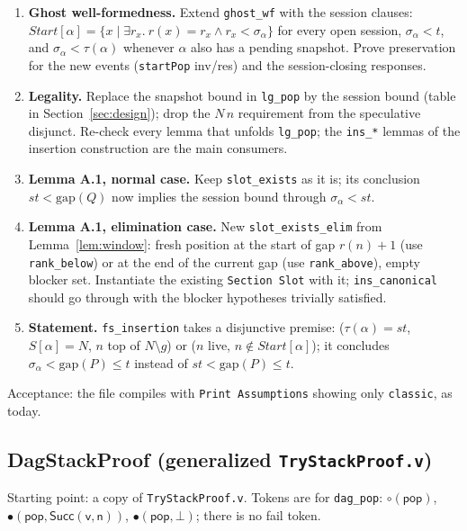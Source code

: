 \documentclass[11pt]{article}
\theoremstyle{definition}
\theoremstyle{remark}
\newcommand{\code}[1]{\texttt{#1}}
\newcommand{\file}[1]{\texttt{#1}}
\newcommand{\Start}{\mathit{Start}}
\newcommand{\sess}{\sigma}
\newcommand{\sol}[1]{\textbf{#1}}
\newcommand{\tok}[1]{\mathsf{#1}}
\newcommand{\Succ}{\mathsf{Succ}}
\newcommand{\gap}{\mathrm{gap}}
\begin{document}
\begin{enumerate}[nosep]
\item \sol{Ghost well-formedness.} Extend \code{ghost\_wf} with the
  session clauses: $\Start[\alpha] = \{x \mid \exists r_x.\ r(x) = r_x \wedge r_x < \sess_\alpha\}$
  for every open session, $\sess_\alpha < t$, and
  $\sess_\alpha < \tau(\alpha)$ whenever $\alpha$ also has a pending
  snapshot. Prove preservation for the new events (\code{startPop}
  inv/res) and the session-closing responses.
\item \sol{Legality.} Replace the snapshot bound in \code{lg\_pop} by the
  session bound (table in Section~\ref{sec:design}); drop the
  $N\,n$ requirement from the speculative disjunct. Re-check every lemma
  that unfolds \code{lg\_pop}; the \code{ins\_*} lemmas of the insertion
  construction are the main consumers.
\item \sol{Lemma A.1, normal case.} Keep \code{slot\_exists} as it is; its
  conclusion $st < \gap(Q)$ now implies the session bound through
  $\sess_\alpha < st$.
\item \sol{Lemma A.1, elimination case.} New \code{slot\_exists\_elim}
  from Lemma~\ref{lem:window}: fresh position at the start of gap
  $r(n)+1$ (use \code{rank\_below}) or at the end of the current gap (use
  \code{rank\_above}), empty blocker set. Instantiate the existing
  \code{Section Slot} with it; \code{ins\_canonical} should go through
  with the blocker hypotheses trivially satisfied.
\item \sol{Statement.} \code{fs\_insertion} takes a disjunctive premise:
  ($\tau(\alpha)=st$, $S[\alpha]=N$, $n$ top of $N\setminus g$) or
  ($n$ live, $n \notin \Start[\alpha]$); it concludes
  $\sess_\alpha < \gap(P) \le t$ instead of $st < \gap(P) \le t$.
\end{enumerate}

Acceptance: the file compiles with \code{Print Assumptions} showing only
\code{classic}, as today.

\subsection{DagStackProof (generalized \file{TryStackProof.v})}

Starting point: a copy of \file{TryStackProof.v}. Tokens are for
\code{dag\_pop}: $\tok{\circ(pop)}$, $\tok{\bullet(pop,\Succ(v,n))}$,
$\tok{\bullet(pop,\bot)}$; there is no fail token.
\end{document}
